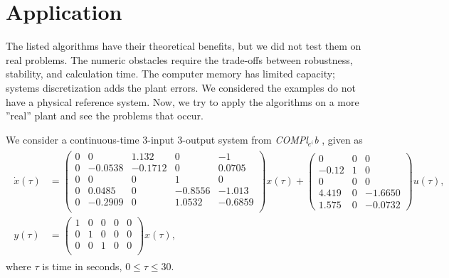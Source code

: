 \chapter{Application}
\label{ch:Allpication}

The listed algorithms have their theoretical benefits, but we did not test them on real problems.  The numeric obstacles require the trade-offs between robustness, stability, and calculation time. The computer memory has limited capacity; systems discretization adds the plant errors. We considered the examples do not have a physical reference system. Now, we try to apply the algorithms on a more ''real'' plant and see the problems that occur. 

We consider a continuous-time 3-input 3-output system from \textit{COMPl$_{e^i}$b} \cite{CompLeib}, given as 
\begin{align}
\label{eq:Appl:realPlant} 
\begin{split}
\dot x(\tau) &= \begin{pmatrix}
0&         0&    1.132&         0&   -1\\
0&   -0.0538&   -0.1712&         0&    0.0705\\
0&         0&         0&    1&         0\\
0&    0.0485&         0&   -0.8556&   -1.013\\
0&   -0.2909&         0&    1.0532&   -0.6859\\
\end{pmatrix}x(\tau) + 
\begin{pmatrix}
0&         0&         0\\
-0.12&     1&         0\\
0&         0&         0\\
4.419&     0&   -1.6650\\
1.575&     0&   -0.0732
\end{pmatrix}u(\tau), \\
y(\tau) & = 
\begin{pmatrix}
1&     0&     0&     0&     0\\
0&     1&     0&     0&     0\\
0&     0&     1&     0&     0\\
\end{pmatrix}x(\tau), 
\end{split}
\end{align}
where $\tau$ is time in seconds, $0\leq \tau \leq 30$.

